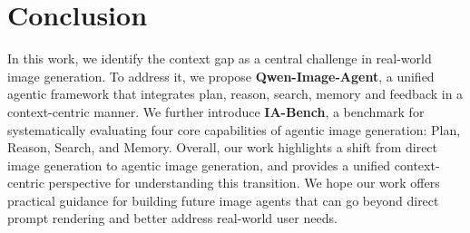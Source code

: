 \section{Conclusion}
In this work, we identify the context gap as a central challenge in real-world image generation. To address it, we propose \textbf{Qwen-Image-Agent}, a unified agentic framework that integrates plan, reason, search, memory and feedback in a context-centric manner. We further introduce \textbf{IA-Bench}, a benchmark for systematically evaluating four core capabilities of agentic image generation: Plan, Reason, Search, and Memory. Overall, our work highlights a shift from direct image generation to agentic image generation, and provides a unified context-centric perspective for understanding this transition.
We hope our work offers practical guidance for building future image agents that can go beyond direct prompt rendering and better address real-world user needs.
